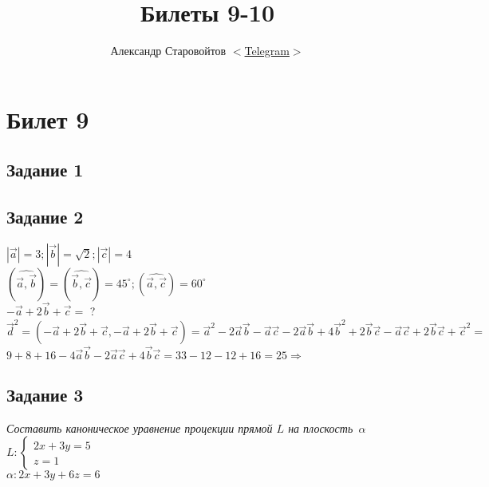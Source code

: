 \documentclass{article}
\author{Александр Старовойтов %
$<$\href{https://t.me/stewkk}%
{Telegram}$>$}
\title{Билеты 9-10}
\theoremstyle{definition}
\theoremstyle{plain}
\begin{document}
\maketitle
\section{Билет 9}
\subsection{Задание 1}
\subsection{Задание 2}
$|\vec{a}| = 3; |\vec{b}| = \sqrt{2}; |\vec{c}| = 4$\\
$( \widehat{\vec{a}, \vec{b}} ) = ( \widehat{\vec{b}, \vec{c}} ) = 45^{\circ}; ( \widehat{\vec{a}, \vec{c}} ) = 60^{\circ}$\\
$-\vec{a} + 2 \vec{b} + \vec{c} =$ ?\\

$\vec{d}^{2}=(-\vec{a} + 2 \vec{b} + \vec{c}, -\vec{a} + 2 \vec{b} + \vec{c}) = \vec{a}^{2} -2 \vec{a} \vec{b} - \vec{a} \vec{c} - 2 \vec{a} \vec{b} + 4 \vec{b}^{2} + 2 \vec{b} \vec{c} - \vec{a} \vec{c} + 2 \vec{b} \vec{c} + \vec{c}^{2} =$\\
$9 + 8 + 16 - 4 \vec{a}\vec{b} - 2 \vec{a}\vec{c} + 4 \vec{b}\vec{c} = 33 - 12 - 12 + 16 = 25 \Rightarrow$ 
\subsection{Задание 3}
\emph{Составить каноническое уравнение процекции прямой $L$ на \mbox{плоскость $\alpha$}}\\
$L: \begin{cases}
  2x + 3y = 5\\
  z = 1
\end{cases}$\\
$\alpha: 2x+3y+6z = 6$
\end{document}
